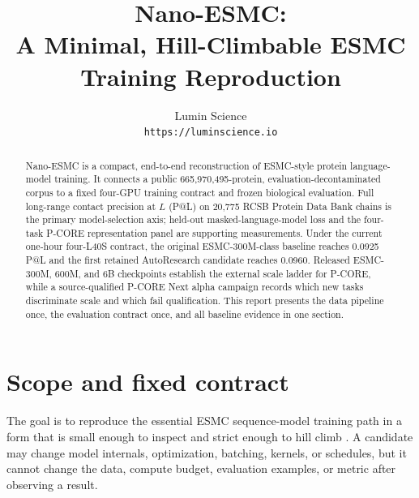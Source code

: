 \documentclass{article}
\title{Nano-ESMC:\\
A Minimal, Hill-Climbable ESMC Training Reproduction}
\author{%
  Lumin Science\\
  \texttt{https://luminscience.io}
}
\begin{document}
\raggedbottom
\maketitle

\begin{abstract}
Nano-ESMC is a compact, end-to-end reconstruction of ESMC-style protein
language-model training. It connects a public 665,970,495-protein,
evaluation-decontaminated corpus to a fixed four-GPU training contract and
frozen biological evaluation. Full long-range contact precision at $L$
(P@L) on 20,775 RCSB Protein Data Bank chains is the primary model-selection
axis; held-out masked-language-model loss and the four-task P-CORE
representation panel are supporting measurements. Under the current one-hour
four-L40S contract, the original ESMC-300M-class baseline reaches 0.0925 P@L
and the first retained AutoResearch candidate reaches 0.0960. Released
ESMC-300M, 600M, and 6B checkpoints establish the external scale ladder for
P-CORE, while a source-qualified P-CORE Next alpha campaign records which new
tasks discriminate scale and which fail qualification. This report presents
the data pipeline once, the evaluation contract once, and all baseline
evidence in one section.
\end{abstract}

\section{Scope and fixed contract}

The goal is to reproduce the essential ESMC sequence-model training path in a
form that is small enough to inspect and strict enough to hill climb
\citep{candido2026language}. A candidate may change model internals,
optimization, batching, kernels, or schedules, but it cannot change the data,
compute budget, evaluation examples, or metric after observing a result.
\end{document}
